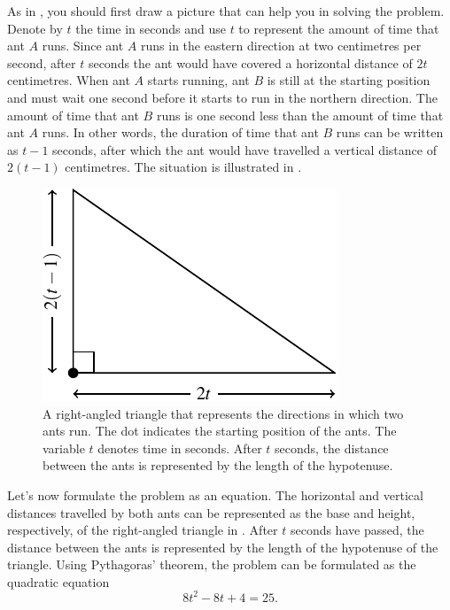 \documentclass[a4paper,oneside,12pt]{article}
\begin{document}
\begin{solution}
As in , you should first draw a
picture that can help you in solving the problem.  Denote by $t$ the
time in seconds and use $t$ to represent the amount of time that ant
$A$ runs.  Since ant $A$ runs in the eastern direction at two
centimetres per second, after $t$ seconds the ant would have covered a
horizontal distance of $2t$ centimetres.  When ant $A$ starts running,
ant $B$ is still at the starting position and must wait one second
before it starts to run in the northern direction.  The amount of time
that ant $B$ runs is one second less than the amount of time that ant
$A$ runs.  In other words, the duration of time that ant $B$ runs can
be written as $t - 1$ seconds, after which the ant would have
travelled a vertical distance of $2(t - 1)$ centimetres.  The
situation is illustrated in .

\begin{figure}[!htbp]
\centering
\includegraphics[scale=1.2]{image/09/running-ants.pdf}
\caption{%
  A right-angled triangle that represents the directions in which two
  ants run.  The dot indicates the starting position of the ants.  The
  variable $t$ denotes time in seconds.  After $t$ seconds, the
  distance between the ants is represented by the length of the
  hypotenuse.
}
\label{fig:running_ants_triangle}
\end{figure}

Let's now formulate the problem as an equation.  The horizontal and
vertical distances travelled by both ants can be represented as the
base and height, respectively, of the right-angled triangle in
.  After $t$ seconds have passed,
the distance between the ants is represented by the length of the
hypotenuse of the triangle.  Using Pythagoras' theorem, the problem
can be formulated as the quadratic equation
\begin{equation}
\label{eqn:running_ants_quadratic_equation}
8t^2 - 8t + 4
=
25.
\end{equation}


\end{solution}
\end{document}
